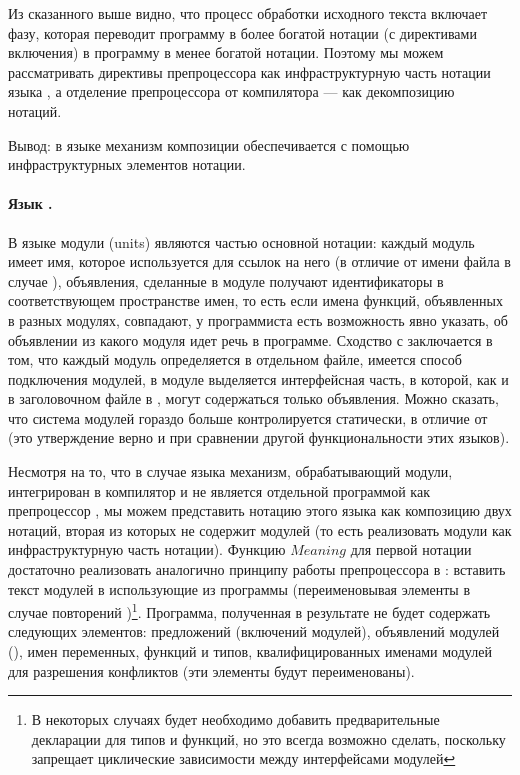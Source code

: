 Из сказанного выше видно, что процесс обработки исходного текста включает фазу, которая переводит программу в более богатой нотации (с директивами включения) в программу в менее богатой нотации. Поэтому мы можем рассматривать директивы препроцессора как инфраструктурную часть нотации языка , а отделение препроцессора от компилятора --- как декомпозицию нотаций. 

Вывод: в языке  механизм композиции обеспечивается с помощью инфраструктурных элементов нотации. 

\paragraph*{Язык . } В языке  \cite{???} модули (units) являются частью основной нотации: каждый модуль имеет имя, которое используется для ссылок на него (в отличие от имени файла в случае ), объявления, сделанные в модуле получают идентификаторы в соответствующем пространстве имен, то есть если имена функций, объявленных в разных модулях, совпадают, у программиста есть возможность явно указать, об объявлении из какого модуля идет речь в программе. Сходство с  заключается в том, что каждый модуль определяется в отдельном файле, имеется способ подключения модулей, в модуле выделяется интерфейсная часть, в которой, как и в заголовочном файле в , могут содержаться только объявления. Можно сказать, что система модулей  гораздо больше контролируется статически, в отличие от  (это утверждение верно и при сравнении другой функциональности этих языков). 

Несмотря на то, что в случае языка  механизм, обрабатывающий модули, интегрирован в компилятор и не является отдельной программой как препроцессор , мы можем представить нотацию этого языка как композицию двух нотаций, вторая из которых не содержит модулей (то есть реализовать модули как инфраструктурную часть нотации). Функцию $Meaning$ для первой нотации достаточно реализовать аналогично принципу работы препроцессора в : вставить текст модулей в использующие из программы (переименовывая элементы в случае повторений \cite{capture-avoiding-substitution})\footnote{В некоторых случаях будет необходимо добавить предварительные декларации для типов и функций, но это всегда возможно сделать, поскольку  запрещает циклические зависимости между интерфейсами модулей}. Программа, полученная в результате не будет содержать следующих элементов: предложений  (включений модулей), объявлений модулей (), имен переменных, функций и типов, квалифицированных именами модулей для разрешения конфликтов (эти элементы будут переименованы).

